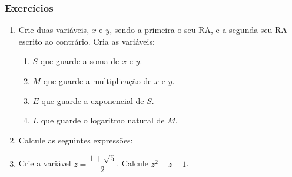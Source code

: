 \documentclass{beamer}
\begin{document}
\begin{frame}
\frametitle{Exerc\'icios}

\begin{enumerate}
\item Crie duas vari\'aveis, $x$ e $y$, sendo a primeira o seu RA, e a segunda seu RA escrito ao contr\'ario. Cria as vari\'aveis:
\begin{enumerate}
\item $S$ que guarde a soma de $x$ e $y$.
\item $M$ que guarde a multiplica\c{c}\~ao de $x$ e $y$.
\item $E$ que guarde a exponencial de $S$.
\item $L$ que guarde o logaritmo natural de $M$.
\end{enumerate}
\item Calcule as seguintes express\~oes:
\begin{enumerate}
\end{enumerate}
\item Crie a vari\'avel $z = \dfrac{1+\sqrt{5}}{2}$. Calcule $z^2-z-1$.
\end{enumerate}
\end{frame}
\end{document}
